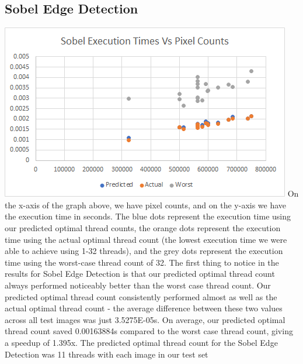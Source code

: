 \documentclass{article}
\begin{document}
    \subsection{Sobel Edge Detection}
    \includegraphics[width=\textwidth]{source/images/edge_detection.png}
    On the x-axis of the graph above, we have pixel counts, and on the y-axis we have the execution time in seconds. The blue dots represent the execution time using our predicted optimal thread counts, the orange dots represent the execution time using the actual optimal thread count (the lowest execution time we were able to achieve using 1-32 threads), and the grey dots represent the execution time using the worst-case thread count of 32. The first thing to notice in the results for Sobel Edge Detection is that our predicted optimal thread count always performed noticeably better than the worst case thread count. Our predicted optimal thread count consistently performed almost as well as the actual optimal thread count - the average difference between these two values across all test images was just 3.5275E-05s. On average, our predicted optimal thread count saved 0.00163884s compared to the worst case thread count, giving a speedup of 1.395x.  The predicted optimal thread count for the Sobel Edge Detection was 11 threads with each image in our test set
    
\end{document}

